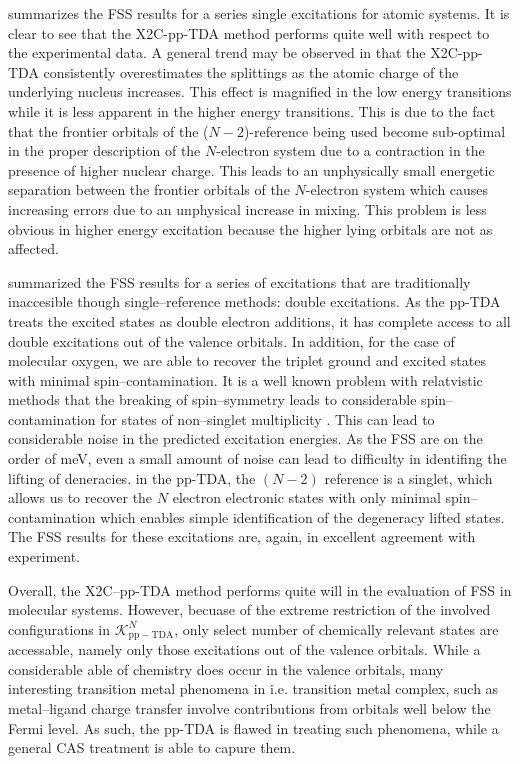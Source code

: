  summarizes the FSS results for a series single excitations
for atomic systems. It is clear to see that the X2C-pp-TDA method performs quite
well with respect to the experimental data. A general trend may be observed in
that the X2C-pp-TDA consistently overestimates the splittings as the atomic
charge of the underlying nucleus increases. This effect is magnified in the low
energy transitions while it is less apparent in the higher energy transitions.
This is due to the fact that the frontier orbitals of the ($N-2$)-reference
being used become sub-optimal in the proper description of the $N$-electron
system due to a contraction in the presence of higher nuclear charge. This leads
to an unphysically small energetic separation between the frontier orbitals of
the $N$-electron system which causes increasing errors due to an unphysical
increase in mixing. This problem is less obvious in higher energy excitation
because the higher lying orbitals are not as affected.

 summarized the FSS results for a series of excitations that
are traditionally inaccesible though single--reference methods: double
excitations.  As the pp-TDA treats the excited states as double electron
additions, it has complete access to all double excitations out of the valence
orbitals. In addition, for the case of molecular oxygen, we are able to recover
the triplet ground and excited states with minimal spin--contamination. It is a
well known problem with relatvistic methods that the breaking of spin--symmetry
leads to considerable spin--contamination for states of non--singlet
multiplicity . This can lead to considerable noise in the predicted excitation
energies. As the FSS are on the order of meV, even a small amount of noise can
lead to difficulty in identifing the lifting of deneracies. in the pp-TDA, the
$(N-2)$ reference is a singlet, which allows us to recover the $N$ electron
electronic states with only minimal spin--contamination which enables simple
identification of the degeneracy lifted states. The FSS results for these
excitations are, again, in excellent agreement with experiment.

Overall, the X2C--pp-TDA method performs quite will in the evaluation of FSS in
molecular systems. However, becuase of the extreme restriction of the involved
configurations in $\mathcal{K}_\mathrm{pp-TDA}^N$, only select number of
chemically relevant states are accessable, namely only those excitations out of
the valence orbitals. While a considerable able of chemistry does occur in the
valence orbitals, many interesting transition metal phenomena in i.e. transition
metal complex, such as metal--ligand charge transfer involve contributions from
orbitals well below the Fermi level. As such, the pp-TDA is flawed in treating
such phenomena, while a general CAS treatment is able to capure them.
